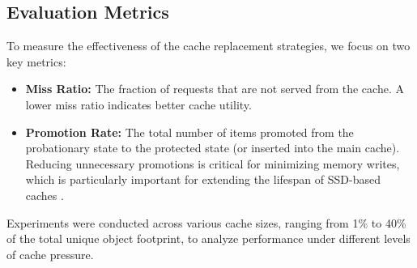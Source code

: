 \subsection{Evaluation Metrics}
To measure the effectiveness of the cache replacement strategies, we
focus on two key metrics:
\begin{itemize}
  \item \textbf{Miss Ratio:} The fraction of requests that are not
    served from the cache. A lower miss ratio indicates better cache utility.
  \item \textbf{Promotion Rate:} The total number of items promoted
    from the probationary state to the protected state (or inserted
    into the main cache). Reducing unnecessary promotions is critical
    for minimizing memory writes, which is particularly important for
    extending the lifespan of SSD-based caches \cite{Sun2022NCache,
    Wang2018Efficient}.
\end{itemize}

Experiments were conducted across various cache sizes, ranging from
1\% to 40\% of the total unique object footprint, to analyze
performance under different levels of cache pressure.
